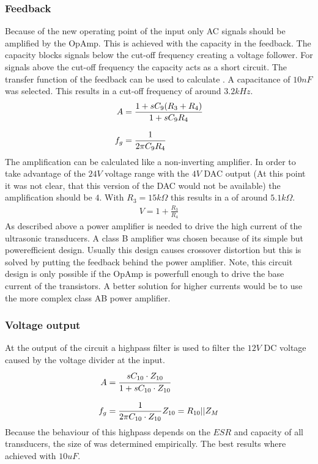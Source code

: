 \subsubsection*{Feedback}
%
Because of the new operating point of the input only AC signals should be amplified by the OpAmp. This is achieved with the capacity  in the feedback. The capacity blocks signals below the cut-off frequency creating a voltage follower. For signals above the cut-off frequency the capacity acts as a short circuit. The transfer function of the feedback can be used to calculate . A capacitance of $10nF$ was selected. This results in a cut-off frequency of around $3.2kHz$.
%
\begin{align}
  A &= \frac{1 + s C_9 (R_3 + R_4)}{1 + s C_9 R_4}\pmath
  f_g &= \frac{1}{2 \pi C_9 R_4}
\end{align}
%
The amplification can be calculated like a non-inverting amplifier. In order to take advantage of the $24V$ voltage range with the $4V$ DAC output (At this point it was not clear, that this version of the DAC would not be available) the amplification should be $4$. With $R_3 = 15k\Omega$ this results in a  of around $5.1k\Omega$.
%
\begin{align}
  V = 1 + \frac{R_3}{R_4}
\end{align}
%
As described above a power amplifier is needed to drive the high current of the ultrasonic transducers. A class B amplifier was chosen because of its simple but powerefficient design.\cite{okorn_halbleiterschaltung_2020} Usually this design causes crossover distortion but this is solved by putting the feedback behind the power amplifier. Note, this circuit design is only possible if the OpAmp is powerfull enough to drive the base current of the transistors. A better solution for higher currents would be to use the more complex class AB power amplifier.
\subsubsection*{Voltage output}
At the output of the circuit a highpass filter is used to filter the $12V$ DC voltage caused by the voltage divider at the input.
%
\begin{align}
  A &= \cfrac{sC_{10} \cdot Z_{10}}{1 + sC_{10} \cdot Z_{10}} \pmath
  f_g &= \frac{1}{2 \pi C_{10} \cdot Z_{10}}
  Z_{10} = R_{10} || Z_M
\end{align}
%
Because the behaviour of this highpass depends on the $ESR$ and capacity of all transducers, the size of  was determined empirically. The best results where achieved with $10uF$.\p

